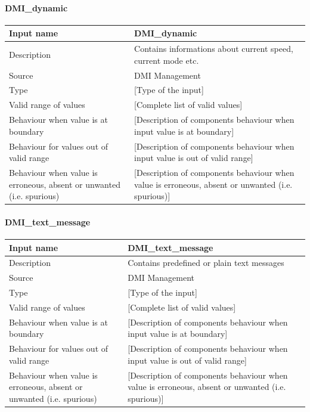 \paragraph{DMI\_dynamic}

\begin{longtable}{p{}p{}}
\toprule
Input name				& DMI\_dynamic \\
\midrule
Description				& Contains informations about current speed, current mode etc. \\
\midrule
Source					& DMI Management \\ 
\midrule
Type					& [Type of the input] \\
\midrule
Valid range of values	& [Complete list of valid values] \\
\midrule
Behaviour when value is at boundary	& [Description of components behaviour when input value is at boundary] \\
\midrule
Behaviour for values out of valid range	& [Description of components behaviour when input value is out of valid range] \\
\midrule
Behaviour when value is erroneous, absent or unwanted (i.e. spurious) & [Description of components behaviour when value is erroneous, absent or unwanted (i.e. spurious)] \\
\bottomrule
\end{longtable}

\paragraph{DMI\_text\_message}

\begin{longtable}{p{}p{}}
\toprule
Input name				& DMI\_text\_message \\
\midrule
Description				& Contains predefined or plain text messages \\
\midrule
Source					& DMI Management \\ 
\midrule
Type					& [Type of the input] \\
\midrule
Valid range of values	& [Complete list of valid values] \\
\midrule
Behaviour when value is at boundary	& [Description of components behaviour when input value is at boundary] \\
\midrule
Behaviour for values out of valid range	& [Description of components behaviour when input value is out of valid range] \\
\midrule
Behaviour when value is erroneous, absent or unwanted (i.e. spurious) & [Description of components behaviour when value is erroneous, absent or unwanted (i.e. spurious)] \\
\bottomrule
\end{longtable}


